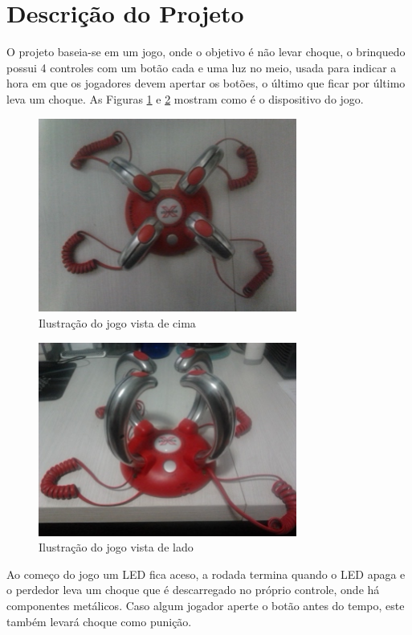 \documentclass[article]{IEEEtran}
\begin{document}
\section{Descrição do Projeto}
O projeto baseia-se em um jogo, onde o objetivo é não levar choque, o brinquedo possui 4 controles com um botão cada e uma luz no meio, usada para indicar a hora em que os jogadores devem apertar os botões, o último que ficar por último leva um choque. As Figuras \ref{fig:jogochoque1} e \ref{fig:jogochoque2} mostram como é o dispositivo do jogo.

	\begin{figure}	
		\centering
		\includegraphics[width=8.5cm]{./dispositivo1.png}
		\caption{Ilustração do jogo vista de cima}
 		\label{fig:jogochoque1}
	\end{figure}

	\begin{figure}	
		\centering
		\includegraphics[width=8.5cm]{./dispositivo2.png}
		\caption{Ilustração do jogo vista de lado}
 		\label{fig:jogochoque2}
	\end{figure}

Ao começo do jogo um LED fica aceso, a rodada termina quando o LED apaga e o perdedor  leva um choque que é descarregado no próprio controle, onde há componentes metálicos. Caso algum jogador aperte o botão antes do tempo, este também levará choque como punição.
\end{document}
